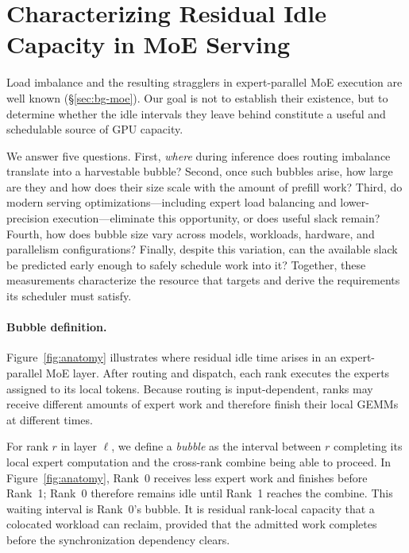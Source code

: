 \section{Characterizing Residual Idle Capacity in \ac{MoE} Serving}
\label{sec:characterization}


\acresetall

Load imbalance and the resulting stragglers in expert-parallel \ac{MoE}
execution are well known (\S\ref{sec:bg-moe}). Our goal is not to
establish their existence, but to determine whether the idle intervals
they leave behind constitute a useful and schedulable source of GPU
capacity.

We answer five questions. First, \emph{where} during inference does routing
imbalance translate into a harvestable bubble? Second, once such bubbles
arise, how large are they and how does their size scale with the amount of
prefill work? Third, do modern serving optimizations---including expert
load balancing and lower-precision execution---eliminate this opportunity,
or does useful slack remain? Fourth, how does bubble size vary across
models, workloads, hardware, and parallelism configurations? Finally,
despite this variation, can the available slack be predicted early enough
to safely schedule work into it? Together, these measurements characterize
the resource that \sys{} targets and derive the requirements its scheduler
must satisfy.

\label{sec:char-method}
\paragraph{Bubble definition.}
Figure~\ref{fig:anatomy} illustrates where residual idle time arises in an
expert-parallel \ac{MoE} layer. After routing and dispatch, each rank
executes the experts assigned to its local tokens. Because routing is
input-dependent, ranks may receive different amounts of expert work and
therefore finish their local \ac{GEMM}s at different times.

For rank $r$ in layer $\ell$, we define a \emph{bubble} as the interval
between $r$ completing its local expert computation and the cross-rank
combine being able to proceed. In Figure~\ref{fig:anatomy}, Rank~0 receives
less expert work and finishes before Rank~1; Rank~0 therefore remains idle
until Rank~1 reaches the combine. This waiting interval is Rank~0's bubble.
It is residual rank-local capacity that a colocated workload can reclaim,
provided that the admitted work completes before the synchronization
dependency clears.

